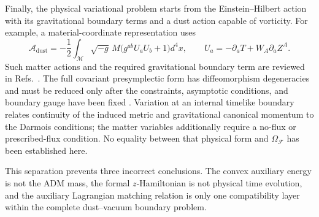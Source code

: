 Finally, the physical variational problem starts from the
Einstein--Hilbert action with its gravitational boundary terms and a dust
action capable of vorticity. For example, a material-coordinate
representation uses
\begin{equation}
\mathcal A_{\mathrm{dust}}
=-\frac12\int_{\mathcal M}\sqrt{-g}\,M
\bigl(g^{ab}U_aU_b+1\bigr)d^4x,
\qquad
U_a=-\partial_aT+W_A\partial_aZ^A.
\label{eq:ms-vortical-dust-action}
\end{equation}
Such matter actions and the required gravitational boundary term are
reviewed in Refs.~\cite{Brown1993CQG,GibbonsHawking1977PRD}.
The full covariant presymplectic form has diffeomorphism degeneracies and
must be reduced only after the constraints, asymptotic conditions, and
boundary gauge have been fixed \cite{LeeWald1990JMP,IyerWald1994PRD}.
Variation at an internal timelike boundary
relates continuity of the induced metric and gravitational canonical
momentum to the Darmois conditions; the matter variables additionally
require a no-flux or prescribed-flux condition. No equality between that
physical form and $\Omega_{\mathcal F}$ has been established here.

This separation prevents three incorrect conclusions. The convex auxiliary
energy is not the ADM mass, the formal $z$-Hamiltonian is not physical time
evolution, and the auxiliary Lagrangian matching relation is only one
compatibility layer within the complete dust--vacuum boundary problem.
